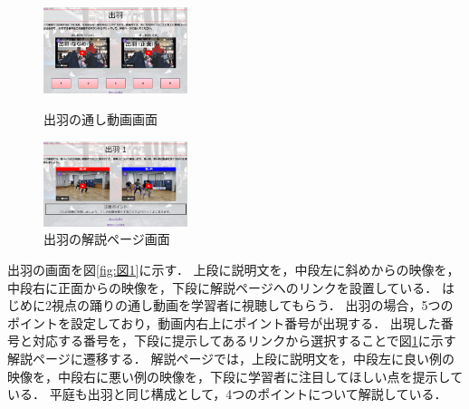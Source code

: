 \documentclass[twocolumn,10pt,a4j]{ltjsarticle}
\begin{document}
\begin{figure}[htbp]
 \begin{minipage}{0.5\hsize}
  \centering
  \includegraphics[width=42mm]{figures/zu11.png}
  \caption{出羽の通し動画画面}
   \label{fig:図1}
 \end{minipage}
 \begin{minipage}{0.5\hsize}
  \centering
  \includegraphics[width=42mm]{figures/zu12.png}
  \caption{出羽の解説ページ画面}
   \label{fig:図2}
 \end{minipage}
\end{figure}

出羽の画面を図\ref{fig:図1}に示す．
上段に説明文を，中段左に斜めからの映像を，中段右に正面からの映像を，下段に解説ページへのリンクを設置している．
はじめに2視点の踊りの通し動画を学習者に視聴してもらう．
出羽の場合，5つのポイントを設定しており，動画内右上にポイント番号が出現する．
出現した番号と対応する番号を，下段に提示してあるリンクから選択することで図\ref{fig:図2}に示す解説ページに遷移する．
解説ページでは，上段に説明文を，中段左に良い例の映像を，中段右に悪い例の映像を，下段に学習者に注目してほしい点を提示している．
平庭も出羽と同じ構成として，4つのポイントについて解説している．
\end{document}
